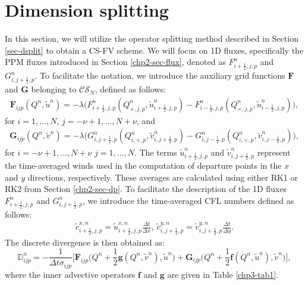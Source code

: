\section{Dimension splitting}
\label{sec-csdsplit}
In this section, we will utilize the operator splitting method described in Section \ref{sec-dsplit} 
to obtain a CS-FV scheme.
We will focus on 1D fluxes, specifically the PPM fluxes introduced in Section \ref{chp2-sec-flux},
denoted as ${F}_{i+\frac{1}{2},j,p}^n$ and ${G}_{i,j+\frac{1}{2},p}^n$.
To facilitate the notation, we introduce the auxiliary grid functions $\mathbf{F}$ and $\mathbf{G}$ belonging to $\mathcal{CS}_{N}$, defined as follows:
\begin{align*}
	\mathbf{F}_{ijp}({Q^n,\tilde{u}^n}) = -{\lambda} \bigg({F}_{i+\frac{1}{2},j,p}^n(Q^n_{\times,j,p},\tilde{u}^n_{i+\frac{1}{2},j,p})-
	{F}_{i-\frac{1}{2},j,p}^n(Q^n_{\times,j,p},\tilde{u}^n_{i-\frac{1}{2},j,p}) \bigg),
\end{align*}
for $i=1, \ldots, N$, $j=-\nu+1, \ldots, N + \nu$, and
\begin{align*}
	\mathbf{G}_{ijp}({Q^n,\tilde{v}^n}) = -{\lambda} \bigg({G}_{i,j+\frac{1}{2},p}^n(Q^n_{i,\times,p},\tilde{v}^n_{i,j+\frac{1}{2},p})-
	{G}_{i,j-\frac{1}{2},p}^n(Q^n_{i,\times,p},\tilde{v}^n_{i,j-\frac{1}{2},p}) \bigg),
\end{align*}
for $i=-\nu+1, \ldots, N + \nu$  $j=1, \ldots, N$.
The terms $\tilde{u}^n_{i+\frac{1}{2},j,p}$ and $\tilde{v}^n_{i,j+\frac{1}{2},p}$ represent the 
time-averaged winds used in the computation of departure points in the $x$ and $y$ directions, respectively. 
These averages are calculated using either RK1 or RK2 from Section \ref{chp2-sec-dp}. 
To facilitate the description of the 1D fluxes ${F}_{i+\frac{1}{2},j,p}^n$ and ${G}_{i,j+\frac{1}{2},p}^n$, 
we introduce the time-averaged CFL numbers defined as follows:
\begin{align*}
	\tilde{c}_{i+\frac{1}{2},j,p}^{x,n} = \tilde{u}_{i+\frac{1}{2},j,p}^{x,n}\frac{\Delta t}{\Delta x},\
	\tilde{c}_{i,j+\frac{1}{2},p}^{y,n} = \tilde{v}_{i,j+\frac{1}{2},p}^{y,n}\frac{\Delta t}{\Delta y}.
\end{align*}
The discrete divergence is then obtained as:
\begin{equation}
	\label{eqdiv-split}
	\mathbb{D}^n_{ijp} = -\frac{1}{\Delta t \sigma_{ijp}}
	\bigg[
	\mathbf{F}_{ijp}\bigg(Q^n + \frac{1}{2}\mathbf{g}(Q^n,\tilde{v}^n), \tilde{u}^n \bigg) 
	+\mathbf{G}_{ijp}\bigg(Q^n + \frac{1}{2}\mathbf{f}(Q^n,\tilde{u}^n), \tilde{v}^n \bigg) \bigg],
\end{equation}
where the inner advective operators $\mathbf{f}$ and $\mathbf{g}$ are given in Table \ref{chp3-tab1}.

